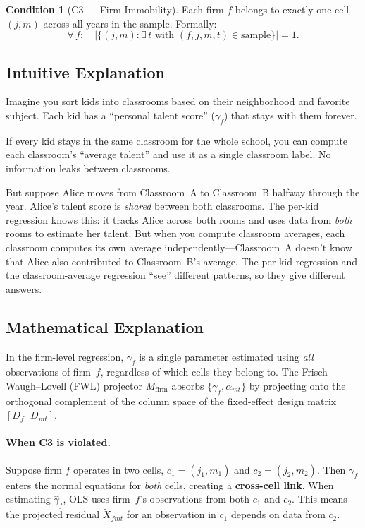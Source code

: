 \documentclass{article}
\theoremstyle{plain}
\theoremstyle{definition}
\newtheorem{condition}{Condition}
\begin{document}
\begin{condition}[C3 --- Firm Immobility]
Each firm $f$ belongs to exactly one cell $(j, m)$ across all years in the
sample.  Formally:
\[
  \forall\, f:\quad
  \bigl|\{(j, m) : \exists\, t \text{ with } (f, j, m, t) \in \text{sample}\}\bigr| = 1.
\]
\end{condition}

\subsection{Intuitive Explanation}

Imagine you sort kids into classrooms based on their neighborhood and favorite
subject.  Each kid has a ``personal talent score'' ($\gamma_f$) that stays with
them forever.

If every kid stays in the same classroom for the whole school, you can compute
each classroom's ``average talent'' and use it as a single classroom label.  No
information leaks between classrooms.

But suppose Alice moves from Classroom~A to Classroom~B halfway through the
year.  Alice's talent score is \emph{shared} between both classrooms.  The
per-kid regression knows this: it tracks Alice across both rooms and uses data
from \emph{both} rooms to estimate her talent.  But when you compute classroom
averages, each classroom computes its own average independently---Classroom~A
doesn't know that Alice also contributed to Classroom~B's average.  The
per-kid regression and the classroom-average regression ``see'' different
patterns, so they give different answers.

\subsection{Mathematical Explanation}

In the firm-level regression, $\gamma_f$ is a single parameter estimated using
\emph{all} observations of firm~$f$, regardless of which cells they belong to.
The Frisch--Waugh--Lovell (FWL) projector $M_\mathrm{firm}$ absorbs
$\{\gamma_f, \alpha_{mt}\}$ by projecting onto the orthogonal complement of the
column space of the fixed-effect design matrix $[D_f \,|\, D_{mt}]$.

\paragraph{When C3 is violated.}
Suppose firm $f$ operates in two cells, $c_1 = (j_1, m_1)$ and
$c_2 = (j_2, m_2)$.  Then $\gamma_f$ enters the normal equations for
\emph{both} cells, creating a \textbf{cross-cell link}.  When estimating
$\hat\gamma_f$, OLS uses firm~$f$'s observations from both $c_1$ and $c_2$.
This means the projected residual $\tilde{X}_{fmt}$ for an observation in $c_1$
depends on data from $c_2$.
\end{document}
